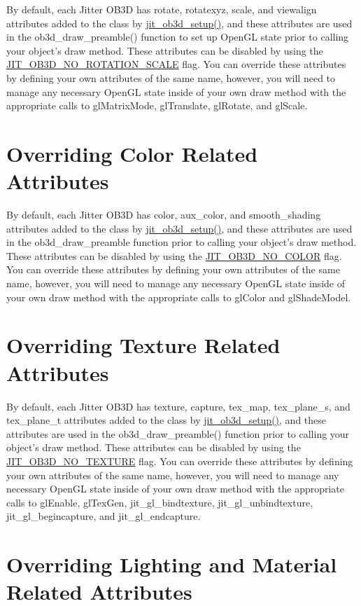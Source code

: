 By default, each Jitter OB3D has rotate, rotatexyz, scale, and viewalign attributes added to the class by \hyperlink{group__ob3dmod_gaee60152a1d507a630e14f0e4f71e86f2}{jit\_\-ob3d\_\-setup()}, and these attributes are used in the ob3d\_\-draw\_\-preamble() function to set up OpenGL state prior to calling your object's draw method. These attributes can be disabled by using the \hyperlink{group__jitter_gafc39daa7e259fa20f8fe918cb4892dc4}{JIT\_\-OB3D\_\-NO\_\-ROTATION\_\-SCALE} flag. You can override these attributes by defining your own attributes of the same name, however, you will need to manage any necessary OpenGL state inside of your own draw method with the appropriate calls to glMatrixMode, glTranslate, glRotate, and glScale.\hypertarget{chapter_jit_ob3ddetails_chapter_jit_ob3ddetails_color}{}\section{Overriding Color Related Attributes}\label{chapter_jit_ob3ddetails_chapter_jit_ob3ddetails_color}
By default, each Jitter OB3D has color, aux\_\-color, and smooth\_\-shading attributes added to the class by \hyperlink{group__ob3dmod_gaee60152a1d507a630e14f0e4f71e86f2}{jit\_\-ob3d\_\-setup()}, and these attributes are used in the ob3d\_\-draw\_\-preamble function prior to calling your object's draw method. These attributes can be disabled by using the \hyperlink{group__jitter_ga6d6e4c119dbea5119a0f452a2486e590}{JIT\_\-OB3D\_\-NO\_\-COLOR} flag. You can override these attributes by defining your own attributes of the same name, however, you will need to manage any necessary OpenGL state inside of your own draw method with the appropriate calls to glColor and glShadeModel.\hypertarget{chapter_jit_ob3ddetails_chapter_jit_ob3ddetails_texture}{}\section{Overriding Texture Related Attributes}\label{chapter_jit_ob3ddetails_chapter_jit_ob3ddetails_texture}
By default, each Jitter OB3D has texture, capture, tex\_\-map, tex\_\-plane\_\-s, and tex\_\-plane\_\-t attributes added to the class by \hyperlink{group__ob3dmod_gaee60152a1d507a630e14f0e4f71e86f2}{jit\_\-ob3d\_\-setup()}, and these attributes are used in the ob3d\_\-draw\_\-preamble() function prior to calling your object's draw method. These attributes can be disabled by using the \hyperlink{group__jitter_gaf7d77e7694341904bdbd7440ae71d42e}{JIT\_\-OB3D\_\-NO\_\-TEXTURE} flag. You can override these attributes by defining your own attributes of the same name, however, you will need to manage any necessary OpenGL state inside of your own draw method with the appropriate calls to glEnable, glTexGen, jit\_\-gl\_\-bindtexture, jit\_\-gl\_\-unbindtexture, jit\_\-gl\_\-begincapture, and jit\_\-gl\_\-endcapture.\hypertarget{chapter_jit_ob3ddetails_chapter_jit_ob3ddetails_lighting}{}\section{Overriding Lighting and Material Related Attributes}\label{chapter_jit_ob3ddetails_chapter_jit_ob3ddetails_lighting}
